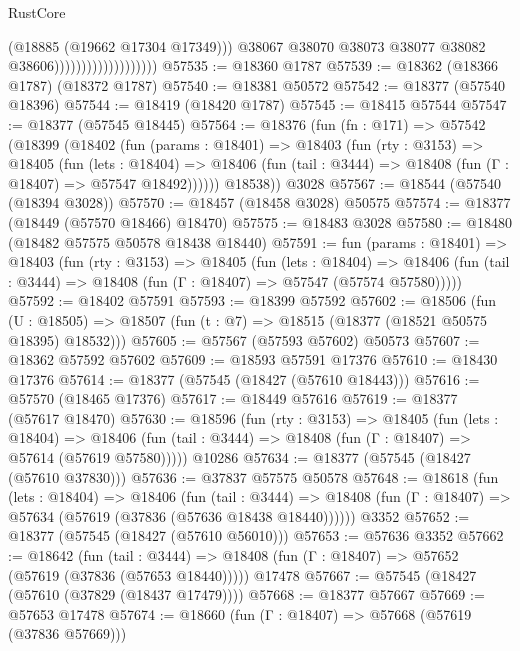 \begin{lexlean}{RustCore}
\begin{coremodule}
                                            (@18885 (@19662 @17304 @17349)))
                                          @38067
                                          @38070
                                          @38073
                                          @38077
                                          @38082
                                          @38606)))))))))))))))))))
@57535 := @18360 @1787
@57539 := @18362 (@18366 @1787) (@18372 @1787)
@57540 := @18381 @50572
@57542 := @18377 (@57540 @18396)
@57544 := @18419 (@18420 @1787)
@57545 := @18415 @57544
@57547 := @18377 (@57545 @18445)
@57564 := @18376
    (fun (fn : @171) =>
    @57542
      (@18399
        (@18402
          (fun (params : @18401) =>
          @18403
            (fun (rty : @3153) =>
            @18405
              (fun (lets : @18404) =>
              @18406 (fun (tail : @3444) => @18408 (fun (Γ : @18407) => @57547 @18492))))))
        @18538))
    @3028
@57567 := @18544 (@57540 (@18394 @3028))
@57570 := @18457 (@18458 @3028) @50575
@57574 := @18377 (@18449 (@57570 @18466) @18470)
@57575 := @18483 @3028
@57580 := @18480 (@18482 @57575 @50578 @18438 @18440)
@57591 := fun (params : @18401) =>
  @18403
    (fun (rty : @3153) =>
    @18405
      (fun (lets : @18404) =>
      @18406 (fun (tail : @3444) => @18408 (fun (Γ : @18407) => @57547 (@57574 @57580)))))
@57592 := @18402 @57591
@57593 := @18399 @57592
@57602 := @18506
    (fun (U : @18505) => @18507 (fun (t : @7) => @18515 (@18377 (@18521 @50575 @18395) @18532)))
@57605 := @57567 (@57593 @57602) @50573
@57607 := @18362 @57592 @57602
@57609 := @18593 @57591 @17376
@57610 := @18430 @17376
@57614 := @18377 (@57545 (@18427 (@57610 @18443)))
@57616 := @57570 (@18465 @17376)
@57617 := @18449 @57616
@57619 := @18377 (@57617 @18470)
@57630 := @18596
    (fun (rty : @3153) =>
    @18405
      (fun (lets : @18404) =>
      @18406 (fun (tail : @3444) => @18408 (fun (Γ : @18407) => @57614 (@57619 @57580)))))
    @10286
@57634 := @18377 (@57545 (@18427 (@57610 @37830)))
@57636 := @37837 @57575 @50578
@57648 := @18618
    (fun (lets : @18404) =>
    @18406
      (fun (tail : @3444) =>
      @18408 (fun (Γ : @18407) => @57634 (@57619 (@37836 (@57636 @18438 @18440))))))
    @3352
@57652 := @18377 (@57545 (@18427 (@57610 @56010)))
@57653 := @57636 @3352
@57662 := @18642
    (fun (tail : @3444) => @18408 (fun (Γ : @18407) => @57652 (@57619 (@37836 (@57653 @18440)))))
    @17478
@57667 := @57545 (@18427 (@57610 (@37829 (@18437 @17479))))
@57668 := @18377 @57667
@57669 := @57653 @17478
@57674 := @18660 (fun (Γ : @18407) => @57668 (@57619 (@37836 @57669)))

\end{coremodule}
\end{lexlean}
